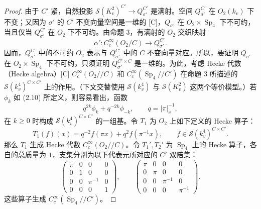 \begin{proof}
由于 $C'$ 紧，自然投影 $\mathcal S(K_v^2)^{C'}\to Q_{\sigma'}^{C'}$ 是满射。空间 $Q_{\sigma'}^{C'}$ 在 $O_2(k_v)$ 下不变；又因为 $\sigma'$ 的 $C'$ 不变向量空间是一维的 [C]，$Q_{\sigma'}$ 在 $O_2\times\operatorname{Sp}_4$ 下不可约，当且仅当 $Q_{\sigma'}^{C'}$ 在 $O_2$ 下不可约。由命题 3，有满射的 $O_2$ 交织映射
\[
 \alpha':C_c^\infty(O_2/C)\longrightarrow Q_{\sigma'}^{C'}.
\]
因而，$Q_{\sigma'}^{C'}$ 中的不可约 $O_2$ 表示与 $Q_{\sigma'}^{C'}$ 中的 $C$ 不变向量对应。所以，要证明 $Q_{\sigma'}$ 在 $O_2\times\operatorname{Sp}_4$ 下不可约，只须证明 $Q_{\sigma'}^{C'\times C}$ 是一维的。为此，考虑 Hecke 代数（Hecke algebra）[C] $C_c^\infty(O_2//C)$ 和 $C_c^\infty(\operatorname{Sp}_4//C')$ 在命题 3 所描述的 $\mathcal S(k_v^4)^{C\times C'}$ 上的作用。（下文交替使用 $\mathcal S(k_v^4)$ 与 $\mathcal S(K_v^2)$ 这两个等价模型。）若 $\phi_k$ 如 (2.10) 所定义，则容易看出，函数
\[
 q^{2k}\phi_k+q^{-2k}\phi_{-k},\qquad q=|\pi|_v^{-1},
\]
在 $k\ge0$ 时构成 $\mathcal S(k_v^4)^{C\times C'}$ 的一组基。令 $T_1$ 为 $O_2$ 上如下定义的 Hecke 算子：
\[
 T_1(f)(x)=q^{-2}f(\pi x)+q^2f(\pi^{-1}x),
 \qquad f\in\mathcal S(k_v^4)^{C\times C'}.
\]
那么 $T_1$ 生成 Hecke 代数 $C_c^\infty(O_2//C)$。令 $T_1',T_2'$ 为 $\operatorname{Sp}_4$ 上的 Hecke 算子，各自的总质量为 $1$，支集分别为以下代表元所对应的 $C'$ 双陪集：
\[
 \begin{pmatrix}\pi&0&0&0\\0&1&0&0\\0&0&\pi^{-1}&0\\0&0&0&1\end{pmatrix},
 \qquad
 \begin{pmatrix}\pi&0&0&0\\0&\pi&0&0\\0&0&\pi^{-1}&0\\0&0&0&\pi^{-1}\end{pmatrix}.
\]
这些算子生成 $C_c^\infty(\operatorname{Sp}_4//C')$。


\end{proof}
